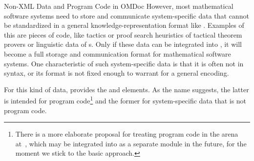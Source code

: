 \begin{module}[id=ext]
\begin{omgroup}[id=ext,short=Auxiliary Elements]
\begin{omgroup}[id=private]{Non-XML Data and Program Code in OMDoc}
However, most mathematical software systems need to store and communicate system-specific
data that cannot be standardized in a general knowledge-representation format like
{\omdoc}. Examples of this are pieces of {} code, like tactics or proof
search heuristics of tactical theorem provers or linguistic data of
{s}.  Only if these data can be integrated into
{\omdoc}, it will become a full storage and communication format for mathematical software
systems. One characteristic of such system-specific data is that it is often not in {\xml}
syntax, or its format is not fixed enough to warrant for a general {\xml} encoding.
  
\begin{definition}[id=privatecode.def]
  For this kind of data, {\omdoc} provides the {} and {}
  elements. As the name suggests, the latter is intended for program code\footnote{There
    is a more elaborate proposal for treating program code in the {\omdoc} arena
    at~\cite{Kohlhase:codemlspec}, which may be integrated into {\omdoc} as a separate
    module in the future, for the moment we stick to the basic approach.} and the former
  for system-specific data that is not program code.
  

\end{definition}
\end{omgroup}
\end{omgroup}
\end{module}
